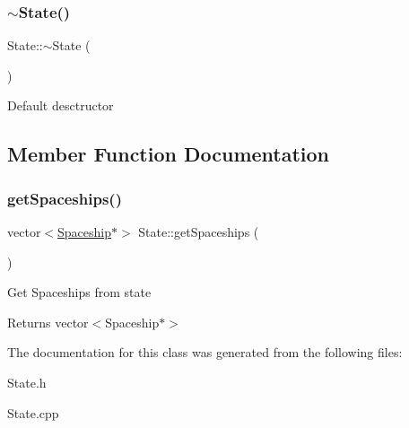 \subsubsection{\texorpdfstring{$\sim$\+State()}{~State()}}
{\footnotesize\ttfamily State\+::$\sim$\+State (\begin{DoxyParamCaption}{ }\end{DoxyParamCaption})}

Default desctructor 

\subsection{Member Function Documentation}
\mbox{\label{classState_a9b00d603ca0a944decf08d096f8b724d}} 
\subsubsection{\texorpdfstring{get\+Spaceships()}{getSpaceships()}}
{\footnotesize\ttfamily vector$<$\hyperlink{classSpaceship}{Spaceship}$\ast$$>$ State\+::get\+Spaceships (\begin{DoxyParamCaption}{ }\end{DoxyParamCaption})\hspace{0.3cm}{\ttfamily [inline]}}

Get Spaceships from state \begin{DoxyReturn}{Returns}
vector$<$\+Spaceship$\ast$$>$ 
\end{DoxyReturn}


The documentation for this class was generated from the following files\+:\begin{DoxyCompactItemize}
\item 
State.\+h\item 
State.\+cpp\end{DoxyCompactItemize}
